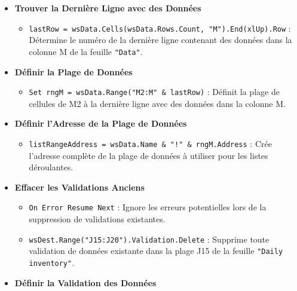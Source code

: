 \documentclass[a4paper, oneside, 12pt, final]{extreport}
\begin{document}
\begin{itemize}
\item\textbf{Trouver la Dernière Ligne avec des Données}

\begin{itemize}
    \item \texttt{lastRow = wsData.Cells(wsData.Rows.Count, "M").End(xlUp).Row} : Détermine le numéro de la dernière ligne contenant des données dans la colonne M de la feuille \texttt{"Data"}.
\end{itemize}

\item\textbf{Définir la Plage de Données}

\begin{itemize}
    \item \texttt{Set rngM = wsData.Range("M2:M" \& lastRow)} : Définit la plage de cellules de M2 à la dernière ligne avec des données dans la colonne M.
\end{itemize}

\item\textbf{Définir l'Adresse de la Plage de Données}

\begin{itemize}
    \item \texttt{listRangeAddress = wsData.Name \& "!" \& rngM.Address} : Crée l'adresse complète de la plage de données à utiliser pour les listes déroulantes.
\end{itemize}

\item\textbf{Effacer les Validations Anciens}

\begin{itemize}
    \item \texttt{On Error Resume Next} : Ignore les erreurs potentielles lors de la suppression de validations existantes.
    \item \texttt{wsDest.Range("J15:J20").Validation.Delete} : Supprime toute validation de données existante dans la plage J15 de la feuille \texttt{"Daily inventory"}.
\end{itemize}

\item\textbf{Définir la Validation des Données}


\end{itemize}
\end{document}
